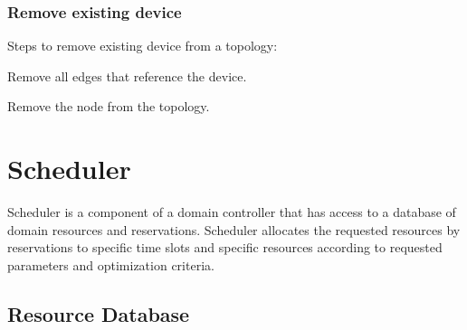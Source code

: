 \documentclass[a4paper]{report}
\begin{document}
\subsection*{Remove existing device}     

Steps to remove existing device from a topology:
\begin{compactenum}
\item Remove all edges that reference the device.
\item Remove the node from the topology.
\end{compactenum}   


\chapter{Scheduler}

Scheduler is a component of a domain controller that has access to a database of domain resources and reservations. Scheduler allocates the requested resources by reservations to specific time slots and specific resources according to requested parameters and optimization criteria.

\section{Resource Database}
\end{document}
